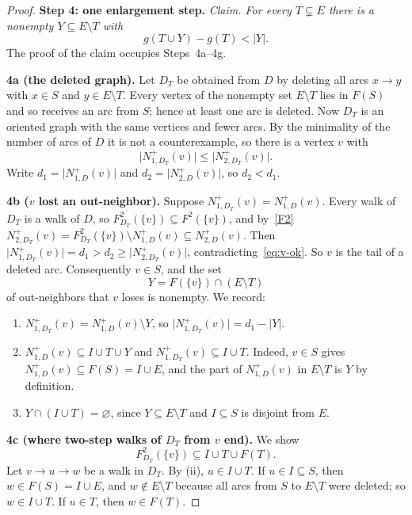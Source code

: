 \documentclass[11pt]{article}
\theoremstyle{remark}
\newcommand{\abs}[1]{\lvert #1\rvert}
\newcommand{\step}[1]{\par\medskip\noindent\textbf{#1}\enspace}
\begin{document}
\begin{proof}
\step{Step 4: one enlargement step.}
\emph{Claim.  For every $T\subsetneq E$ there is a nonempty
$Y\subseteq E\setminus T$ with}
\begin{equation}
\label{eq:deficit-increment}
  g(T\cup Y)-g(T)<\abs{Y}.
\end{equation}
The proof of the claim occupies Steps~4a--4g.

\step{4a (the deleted graph).}
Let $D_T$ be obtained from $D$ by deleting all arcs $x\to y$ with $x\in S$
and $y\in E\setminus T$.  Every vertex of the nonempty set $E\setminus T$
lies in $F(S)$ and so receives an arc from $S$; hence at least one arc is
deleted.  Now $D_T$ is an oriented graph with the same vertices and fewer
arcs.  By the minimality of the number of arcs of $D$ it is not a
counterexample, so there is a vertex $v$ with
\begin{equation}\label{eq:v-ok}
\abs{N_{1,D_T}^+(v)}\le\abs{N_{2,D_T}^+(v)}.
\end{equation}
Write $d_1=\abs{N_{1,D}^+(v)}$ and $d_2=\abs{N_{2,D}^+(v)}$, so $d_2<d_1$.

\step{4b ($v$ lost an out-neighbor).}
Suppose $N_{1,D_T}^+(v)=N_{1,D}^+(v)$.  Every walk of $D_T$ is a walk of $D$,
so $F_{D_T}^2(\{v\})\subseteq F^2(\{v\})$, and by~\ref{F2}
$N_{2,D_T}^+(v)=F_{D_T}^2(\{v\})\setminus N^+_{1,D}(v)\subseteq N_{2,D}^+(v)$.
Then $\abs{N_{1,D_T}^+(v)}=d_1>d_2\ge\abs{N_{2,D_T}^+(v)}$,
contradicting~\eqref{eq:v-ok}.  So $v$ is the tail of a deleted arc.
Consequently $v\in S$, and the set
\[
  Y=F(\{v\})\cap(E\setminus T)
\]
of out-neighbors that $v$ loses is nonempty.  We record:
\begin{enumerate}[label=\textup{(\roman*)},nosep]
\item $N_{1,D_T}^+(v)=N_{1,D}^+(v)\setminus Y$, so
 $\abs{N_{1,D_T}^+(v)}=d_1-\abs Y$.
\item $N_{1,D}^+(v)\subseteq I\cup T\cup Y$ and
 $N_{1,D_T}^+(v)\subseteq I\cup T$.  Indeed, $v\in S$ gives
 $N_{1,D}^+(v)\subseteq F(S)=I\cup E$, and the part of $N^+_{1,D}(v)$ in
 $E\setminus T$ is $Y$ by definition.
\item $Y\cap(I\cup T)=\varnothing$, since $Y\subseteq E\setminus T$ and
 $I\subseteq S$ is disjoint from $E$.
\end{enumerate}

\step{4c (where two-step walks of $D_T$ from $v$ end).}
We show
\begin{equation}
\label{eq:deleted-path-endpoints}
  F_{D_T}^2(\{v\})\subseteq I\cup T\cup F(T).
\end{equation}
Let $v\to u\to w$ be a walk in $D_T$.  By (ii), $u\in I\cup T$.
If $u\in I\subseteq S$, then $w\in F(S)=I\cup E$, and $w\notin E\setminus T$
because all arcs from $S$ to $E\setminus T$ were deleted; so $w\in I\cup T$.
If $u\in T$, then $w\in F(T)$.


\end{proof}
\end{document}
